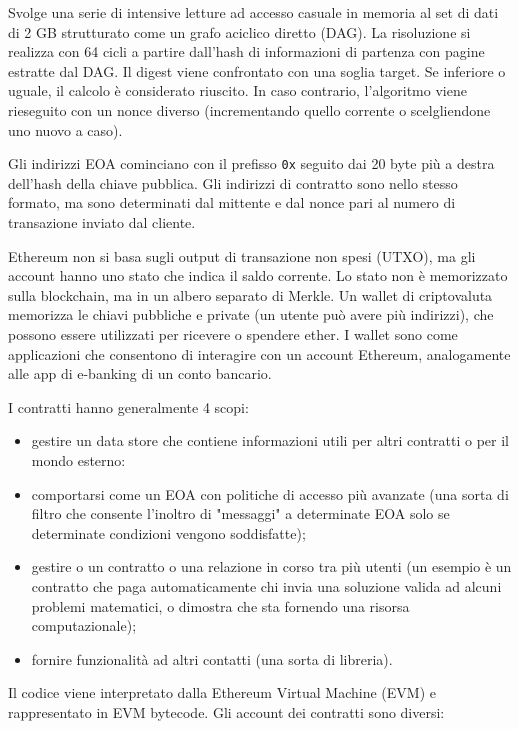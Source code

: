 Svolge una serie di intensive letture ad accesso casuale in memoria al set di dati di 2 GB strutturato come un grafo aciclico diretto (DAG). La risoluzione si realizza con 64 cicli a partire dall'hash di informazioni di partenza con pagine estratte dal DAG. Il digest viene confrontato con una soglia target. Se inferiore o uguale, il calcolo è considerato riuscito. In caso contrario, l'algoritmo viene rieseguito con un nonce diverso (incrementando quello corrente o scelgliendone uno nuovo a caso).

\vspace{5mm}

Gli indirizzi EOA cominciano con il prefisso \texttt{0x} seguito dai 20 byte più a destra dell'hash della chiave pubblica. Gli indirizzi di contratto sono nello stesso formato, ma sono determinati dal mittente e dal nonce pari al numero di transazione inviato dal cliente.

Ethereum non si basa sugli output di transazione non spesi (UTXO), ma gli account hanno uno stato che indica il saldo corrente. Lo stato non è memorizzato sulla blockchain, ma in un albero separato di Merkle. Un wallet di criptovaluta memorizza le chiavi pubbliche e private (un utente può avere più indirizzi), che possono essere utilizzati per ricevere o spendere ether. I wallet sono come applicazioni che consentono di interagire con un account Ethereum, analogamente alle app di e-banking di un conto bancario.

I contratti hanno generalmente 4 scopi:
\begin{itemize}
    \item gestire un data store che contiene informazioni utili per altri contratti o per il mondo esterno:
    \item comportarsi come un EOA con politiche di accesso più avanzate (una sorta di filtro che consente l'inoltro di "messaggi" a determinate EOA solo se determinate condizioni vengono soddisfatte);
    \item gestire o un contratto o una relazione in corso tra più utenti (un esempio è un contratto che paga automaticamente chi invia una soluzione valida ad alcuni problemi matematici, o dimostra che sta fornendo una risorsa computazionale);
    \item fornire funzionalità ad altri contatti (una sorta di libreria).
\end{itemize}
Il codice viene interpretato dalla Ethereum Virtual Machine (EVM) e rappresentato in EVM bytecode. Gli account dei contratti sono diversi:


